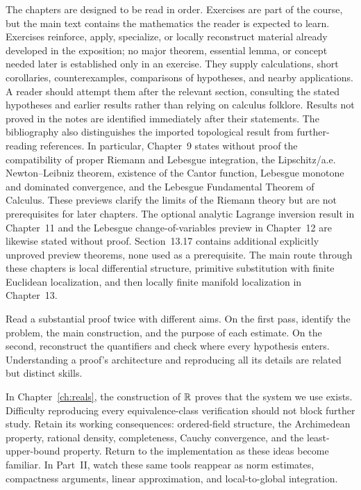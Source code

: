 The chapters are designed to be read in order. Exercises are part of the
course, but the main text contains the mathematics the reader is expected to
learn. Exercises reinforce, apply, specialize, or locally reconstruct
material already developed in the exposition; no major theorem, essential
lemma, or concept needed later is established only in an exercise. They
supply calculations, short corollaries, counterexamples, comparisons of
hypotheses, and nearby applications. A reader should attempt them after the
relevant section, consulting the stated hypotheses and earlier results rather
than relying on calculus folklore. Results not proved in the notes are
identified immediately after their statements. The
bibliography also distinguishes the imported topological result from
further-reading references. In particular, Chapter~9 states without proof
the compatibility of proper Riemann and Lebesgue integration, the
Lipschitz/a.e. Newton--Leibniz theorem, existence of the Cantor function,
Lebesgue monotone and dominated convergence, and the Lebesgue Fundamental
Theorem of Calculus. These previews clarify
the limits of the Riemann theory but are not prerequisites for later chapters.
The optional analytic Lagrange inversion result in Chapter~11 and the
Lebesgue change-of-variables preview in Chapter~12 are likewise stated
without proof. Section~13.17 contains additional explicitly unproved preview theorems,
none used as a prerequisite. The main route through these chapters is local differential
structure, primitive substitution with finite Euclidean localization, and
then locally finite manifold localization in Chapter~13.


Read a substantial proof twice with different aims. On the first pass,
identify the problem, the main construction, and the purpose of each estimate.
On the second, reconstruct the quantifiers and check where every hypothesis
enters. Understanding a proof's architecture and reproducing all its details
are related but distinct skills.

In Chapter~\ref{ch:reals}, the construction of $\mathbb{R}$ proves that the
system we use exists. Difficulty reproducing
every equivalence-class verification should not block further study.
Retain its working consequences: ordered-field structure, the Archimedean
property, rational density, completeness, Cauchy convergence, and the
least-upper-bound property. Return to the implementation as these ideas
become familiar. In Part~II, watch these same tools reappear as norm estimates,
compactness arguments, linear approximation, and local-to-global integration.


